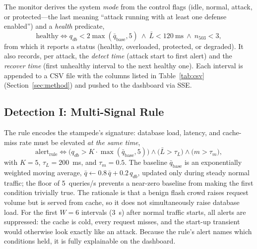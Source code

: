 The monitor derives the system \emph{mode} from the control flags (idle, normal,
attack, or protected---the last meaning ``attack running with at least one defense
enabled'') and a \emph{health} predicate,
\begin{equation}
\mathrm{healthy} \iff q_{db} < 2\max(\bar q_{\mathrm{base}},5)\ \wedge\ \bar L < 120~\text{ms}\ \wedge\ n_{503} < 3,
\label{eq:healthy}
\end{equation}
from which it reports a status (healthy, overloaded, protected, or degraded). It also
records, per attack, the \emph{detect time} (attack start to first alert) and the
\emph{recover time} (first unhealthy interval to the next healthy one). Each interval
is appended to a CSV file with the columns listed in Table~\ref{tab:csv}
(Section~\ref{sec:method}) and pushed to the dashboard via SSE.

\subsection{Detection I: Multi-Signal Rule}
\label{sec:design-rule}
The rule encodes the stampede's signature: database load, latency, and cache-miss rate
must be elevated \emph{at the same time},
\begin{equation}
\mathrm{alert}_{\mathrm{rule}} \iff
\big(q_{db} > K\cdot\max(\bar{q}_{\mathrm{base}}, 5)\big) \wedge
\big(\bar{L} > \tau_L\big) \wedge
\big(m > \tau_m\big),
\label{eq:rule}
\end{equation}
with $K=5$, $\tau_L=200$~ms, and $\tau_m=0.5$. The baseline $\bar{q}_{\mathrm{base}}$
is an exponentially weighted moving average,
$\bar q \leftarrow 0.8\,\bar q + 0.2\,q_{db}$, updated only during steady normal
traffic; the floor of 5~queries/s prevents a near-zero baseline from making the first
condition trivially true. The rationale is that a benign flash crowd raises request
volume but is served from cache, so it does not simultaneously raise database load.
For the first $W=6$ intervals (3~s) after normal traffic starts, all alerts are
suppressed: the cache is cold, every request misses, and the start-up transient would
otherwise look exactly like an attack. Because the rule's alert names which conditions
held, it is fully explainable on the dashboard.

